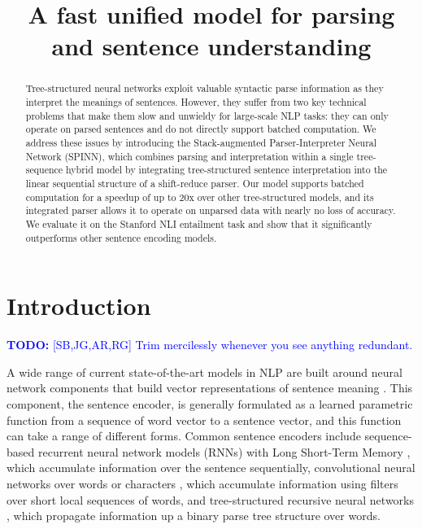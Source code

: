 \documentclass[11pt]{article}
\title{A fast unified model for parsing and sentence understanding}
\author{}
\date{}
\newcommand\todo[1]{\textcolor{blue}{\textbf{TODO:} #1}}
\begin{document}
\maketitle
\begin{abstract}

Tree-structured neural networks exploit valuable syntactic parse information as they interpret the meanings of sentences. However, they suffer from two key technical problems that make them slow and unwieldy for large-scale NLP tasks: they can only operate on parsed sentences and do not directly support batched computation. We address these issues by introducing the Stack-augmented Parser-Interpreter Neural Network (SPINN), which combines parsing and interpretation within a single tree-sequence hybrid model by integrating tree-structured sentence interpretation into the linear sequential structure of a shift-reduce parser. Our model supports batched computation for a speedup of up to 20x over other tree-structured models, and its integrated parser allows it to operate on unparsed data with nearly no loss of accuracy. We evaluate it on the Stanford NLI entailment task and show that it significantly outperforms other sentence encoding models.
\end{abstract}

\section{Introduction}



\todo{[SB,JG,AR,RG] Trim mercilessly whenever you see anything redundant.}

A wide range of current state-of-the-art models in NLP are built around neural network components that build vector representations of sentence meaning \citep{socher2011semi,sutskever2014sequence}. This component, the sentence encoder, is generally formulated as a learned parametric function from a sequence of word vector to a sentence vector, and this function can take a range of different forms. Common sentence encoders include sequence-based recurrent neural network models (RNNs) with Long Short-Term Memory \citep[LSTM,][see Figure~\ref{fig:batching:good}]{hochreiter1997long}, which accumulate information over the sentence sequentially, convolutional neural networks over words or characters \citep{kalchbrenner2014convolutional,DBLP:journals/corr/ZhangZL15}, which accumulate information using filters over short local sequences of words, and tree-structured recursive neural networks \citep[TreeRNNs,][see Figure~\ref{fig:batching:bad}]{goller1996learning,socher2011semi}, which propagate information up a binary parse tree structure over words. 
\end{document}
